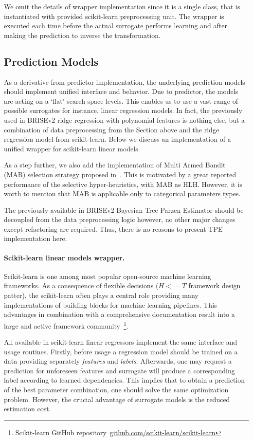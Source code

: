 We omit the details of wrapper implementation since it is a single class, that is instantiated with provided scikit-learn preprocessing unit. The wrapper is executed each time before the actual surrogate performs learning and after making the prediction to inverse the transformation.


\subsection{Prediction Models}\label{impl: prediction models}
As a derivative from predictor implementation, the underlying prediction models should implement unified interface and behavior. Due to predictor, the models are acting on a `flat' search space levels. This enables us to use a vast range of possible surrogates for instance, linear regression models. In fact, the previously used in BRISEv2 ridge regression with polynomial features is nothing else, but a combination of data preprocessing from the Section above and the ridge regression model from scikit-learn. Below we discuss an implementation of a unified wrapper for scikit-learn linear models.

As a step further, we also add the implementation of Multi Armed Bandit (MAB) selection strategy proposed in~\cite{auer2002finite}. This is motivated by a great reported performance of the selective hyper-heuristics, with MAB as HLH. However, it is worth to mention that MAB is applicable only to categorical parameters types.

The previously available in BRISEv2 Bayesian Tree Parzen Estimator should be decoupled from the data preprocessing logic however, no other major changes except refactoring are required. Thus, there is no reasons to present TPE implementation here.

\paragraph{Scikit-learn linear models wrapper.}
Scikit-learn is one among most popular open-source machine learning frameworks. As a consequence of flexible decisions ($H<=T$ framework design patter), the scikit-learn often plays a central role providing many implementations of building blocks for machine learning pipelines. This advantages in combination with a comprehensive documentation result into a large and active framework community~\footnote{Scikit-learn GitHub repository~\url{github.com/scikit-learn/scikit-learn}}.

All available in scikit-learn linear regressors implement the same interface and usage routines. Firstly, before usage a regression model should be trained on a data providing separately \emph{features} and \emph{labels}. Afterwards, one may request a prediction for unforeseen features and surrogate will produce a corresponding label according to learned dependencies. This implies that to obtain a prediction of the best parameter combination, one should solve the same optimization problem. However, the crucial advantage of surrogate models is the reduced estimation cost.

